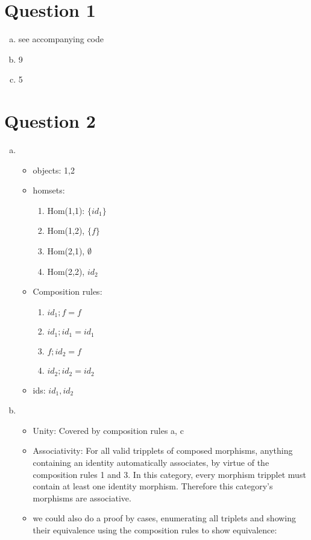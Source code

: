 \documentclass{article}
\begin{document}
\section*{Question 1}
\begin{enumerate}[(a)]
    \item see accompanying code
    \item 9
    \item 5
\end{enumerate}

\section*{Question 2}
\begin{enumerate}[(a)]
    \item
        \begin{itemize}
            \item objects: 1,2
            \item homsets:
            \begin{enumerate}
                \item Hom(1,1): $\{id_1\}$
                \item Hom(1,2), $\{f\}$
                \item Hom(2,1), $\emptyset$
                \item Hom(2,2), $id_2$
            \end{enumerate}
            \item Composition rules:
            \begin{enumerate}
                \item $id_1;f = f$
                \item $id_1;id_1 = id_1$
                \item $f;id_2 = f$
                \item $id_2;id_2 = id_2$
            \end{enumerate}
            \item ids: $id_1, id_2$
        \end{itemize}
    \item
        \begin{itemize}
            \item Unity: Covered by composition rules a, c
            \item Associativity: For all valid tripplets of composed morphisms, anything containing an identity automatically associates, by virtue of the composition rules 1 and 3. In this category, every morphism tripplet must contain at least one identity morphism. Therefore this category's morphisms are associative.
            \item we could also do a proof by cases, enumerating all triplets and showing their equivalence using the composition rules to show equivalence:


\end{itemize}
\end{enumerate}
\end{document}
